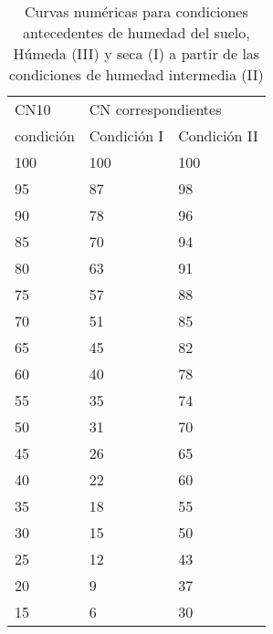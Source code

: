    \begin{table}[h!]
        \centering
        \begin{tabular}{@{}lll@{}}
        CN10      & \multicolumn{2}{l}{CN correspondientes} \\
        condición & Condición I        & Condición II       \\
        100       & 100                & 100                \\
        95        & 87                 & 98                 \\
        90        & 78                 & 96                 \\
        85        & 70                 & 94                 \\
        80        & 63                 & 91                 \\
        75        & 57                 & 88                 \\
        70        & 51                 & 85                 \\
        65        & 45                 & 82                 \\
        60        & 40                 & 78                 \\
        55        & 35                 & 74                 \\
        50        & 31                 & 70                 \\
        45        & 26                 & 65                 \\
        40        & 22                 & 60                 \\
        35        & 18                 & 55                 \\
        30        & 15                 & 50                 \\
        25        & 12                 & 43                 \\
        20        & 9                  & 37                 \\
        15        & 6                  & 30                
        \end{tabular}
        \caption{Curvas numéricas para condiciones antecedentes de humedad del suelo, Húmeda (III) y seca (I) a partir de las condiciones de humedad intermedia (II)}
        \label{tabcsa15}
    \end{table}
    
